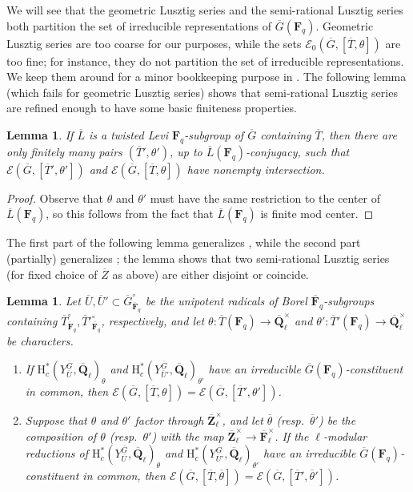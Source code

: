 \documentclass[reqno]{amsart}
\numberwithin{equation}{subsection}
\newcommand{\F}{\mathbf{F}}
\newcommand{\Q}{\mathbf{Q}}
\newcommand{\Z}{\mathbf{Z}}
\newcommand{\ol}[1]{\overline{#1}}
\newcommand{\co}{\colon}
\newcommand\cE{\mathcal{E}}
\newcommand{\rH}{\ensuremath{\mathrm{H}}\xspace}
\newtheorem{lemma}[thm]{Lemma}
\theoremstyle{remark}
\numberwithin{equation}{subsection}
\numberwithin{figure}{subsection}
\begin{document}
We will see that the geometric Lusztig series and the semi-rational Lusztig series both partition the set of irreducible representations of $\ol G(\F_q)$. Geometric Lusztig series are too coarse for our purposes, while the sets $\cE_0(\ol G, [\ol T, \theta])$ are too fine; for instance, they do not partition the set of irreducible representations. We keep them around for a minor bookkeeping purpose in \cite{CF26b}. The following lemma (which fails for geometric Lusztig series) shows that semi-rational Lusztig series are refined enough to have some basic finiteness properties.

\begin{lemma}\label{lemma:finiteness-of-torus-char-pairs}
    If $\ol L$ is a twisted Levi $\F_q$-subgroup of $\ol G$ containing $\ol T$, then there are only finitely many pairs $(\ol T', \theta')$, up to $\ol L(\F_q)$-conjugacy, such that $\cE(\ol G, [\ol T',\theta'])$ and $\cE(\ol G, [\ol T,\theta])$ have nonempty intersection.
\end{lemma}

\begin{proof}
    Observe that $\theta$ and $\theta'$ must have the same restriction to the center of $\ol L(\F_q)$, so this follows from the fact that $\ol L(\F_q)$ is finite mod center.
\end{proof}

The first part of the following lemma generalizes \cite[Th\'eor\`eme 11.8(a)]{Bon06}, while the second part (partially) generalizes \cite[Th\'eor\`eme 2.2]{BM89}; the lemma shows that two semi-rational Lusztig series (for fixed choice of $\ol Z$ as above) are either disjoint or coincide.

\begin{lemma}\label{lemma:geometric-lusztig-series}
    Let $\ol U, \ol U' \subset \ol G^\circ_{\ol\F_q}$ be the unipotent radicals of Borel $\ol\F_q$-subgroups containing $\ol T^\circ_{\ol\F_q}, \ol T'^\circ_{\ol\F_q}$, respectively, and let $\theta\co \ol T(\F_q) \to \ol\Q_\ell^\times$ and $\theta'\co \ol T'(\F_q) \to \ol\Q_\ell^\times$ be characters.
    \begin{enumerate}
        \item If $\rH_c^*(Y_{\ol U}^{\ol G}, \ol\Q_\ell)_\theta$ and $\rH_c^*(Y_{\ol U'}^{\ol G}, \ol\Q_\ell)_{\theta'}$ have an irreducible $\ol G(\F_q)$-constituent in common, then $\cE(\ol G, [\ol T, \theta]) = \cE(\ol G, [\ol T', \theta'])$.
        \item Suppose that $\theta$ and $\theta'$ factor through $\ol\Z_\ell^\times$, and let $\ol\theta$ (resp.\ $\ol\theta'$) be the composition of $\theta$ (resp.\ $\theta'$) with the map $\ol\Z_\ell^\times \to \ol\F_\ell^\times$. If the $\ell$-modular reductions of $\rH_c^*(Y_{\ol U}^{\ol G}, \ol\Q_\ell)_\theta$ and $\rH_c^*(Y_{\ol U'}^{\ol G}, \ol\Q_\ell)_{\theta'}$ have an irreducible $\ol G(\F_q)$-constituent in common, then $\cE(\ol G, [\ol T, \ol\theta]) = \cE(\ol G, [\ol T', \ol\theta'])$.
    \end{enumerate}
\end{lemma}
\end{document}

